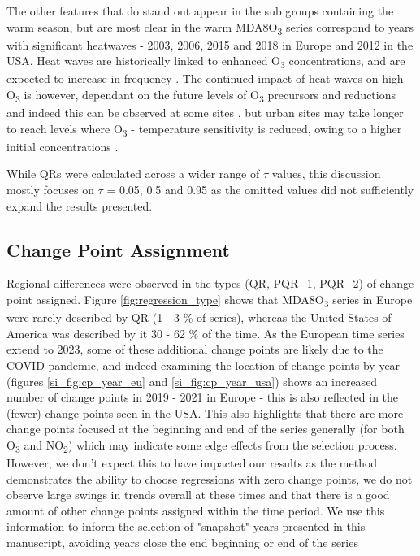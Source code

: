 \documentclass[journal abbreviation, manuscript]{copernicus}
\begin{document}
The other features that do stand out appear in the sub groups containing the warm season, but are most clear in the warm MDA8O\textsubscript{3} series correspond to years with significant heatwaves - 2003, 2006, 2015 and 2018 in Europe and 2012 in the USA. Heat waves are historically linked to enhanced O\textsubscript{3} concentrations, and are expected to increase in frequency \citep{Schär2004, Russo_2015, https://doi.org/10.1002/2016GL068432, Otero_2016, GOULDSBROUGH2022118975}. The continued impact of heat waves on high O\textsubscript{3} is however, dependant on the future levels of O\textsubscript{3} precursors and reductions and indeed this can be observed at some sites \citep{Meehl_2018, OTERO2021118334, acp-25-2725-2025, acp-25-5101-2025}, but urban sites may take longer to reach levels where O\textsubscript{3} - temperature sensitivity is reduced, owing to a higher initial concentrations \citep{VazquezSantiago2024}. 

While QRs were calculated across a wider range of $\tau$ values, this discussion mostly focuses on $\tau$ = 0.05, 0.5 and 0.95 as the omitted values did not sufficiently expand the results presented.

\subsection{Change Point Assignment} \label{sect:new_mda8_piecewise_types}

Regional differences were observed in the types (QR, PQR\_1, PQR\_2) of change point assigned. Figure \ref{fig:regression_type} shows that MDA8O\textsubscript{3} series in Europe were rarely described by QR (1 - 3 \% of series), whereas the United States of America was described by it 30 - 62 \% of the time. As the European time series extend to 2023, some of these additional change points are likely due to the COVID pandemic, and indeed examining the location of change points by year (figures \ref{si_fig:cp_year_eu} and \ref{si_fig:cp_year_usa}) shows an increased number of change points in 2019 - 2021 in Europe - this is also reflected in the (fewer) change points seen in the USA. This also highlights that there are more change points focused at the beginning and end of the series generally (for both O\textsubscript{3} and NO\textsubscript{2}) which may indicate some edge effects from the selection process. However, we don't expect this to have impacted our results as the method demonstrates the ability to choose regressions with zero change points, we do not observe large swings in trends overall at these times and that there is a good amount of other change points assigned within the time period. We use this information to inform the selection of "snapshot" years presented in this manuscript, avoiding years close the end beginning or end of the series
 
\end{document}
